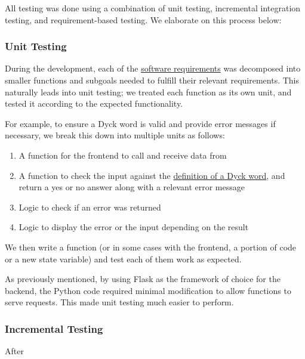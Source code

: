 All testing was done using a combination of unit testing, incremental integration testing, and requirement-based testing. We elaborate on this process below:

\subsubsection{Unit Testing}
During the development, each of the \hyperref[softwareReqs]{software requirements} was decomposed into smaller functions and subgoals needed to fulfill their relevant requirements. This naturally leads into unit testing; we treated each function as its own unit, and tested it according to the expected functionality. 

For example, to ensure a Dyck word is valid and provide error messages if necessary, we break this down into multiple units as follows:
\begin{enumerate}
    \item A function for the frontend to call and receive data from
    \item A function to check the input against the \hyperref[def:seqDyck]{definition of a Dyck word}, and return a yes or no answer along with a relevant error message
    \item Logic to check if an error was returned
    \item Logic to display the error or the input depending on the result
\end{enumerate}

We then write a function (or in some cases with the frontend, a portion of code or a new state variable) and test each of them work as expected. 

As previously mentioned, by using Flask as the framework of choice for the backend, the Python code required minimal modification to allow functions to serve requests. This made unit testing much easier to perform. 

\subsubsection{Incremental Testing}
After